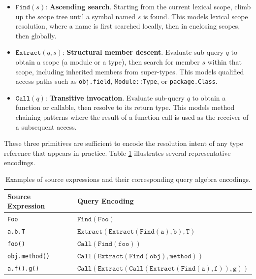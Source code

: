 \begin{itemize}
  \item $\texttt{Find}(s)$: \textbf{Ascending search}. Starting from
    the current lexical scope, climb up the scope tree until a symbol
    named $s$ is found. This models lexical scope resolution, where a
    name is first searched locally, then in enclosing scopes, then globally.
  \item $\texttt{Extract}(q, s)$: \textbf{Structural member descent}.
    Evaluate sub-query $q$ to obtain a scope (a module or a type),
    then search for member $s$ within that scope, including inherited
    members from super-types. This models qualified access paths such
    as \texttt{obj.field}, \texttt{Module::Type}, or \texttt{package.Class}.
  \item $\texttt{Call}(q)$: \textbf{Transitive invocation}. Evaluate
    sub-query $q$ to obtain a function or callable, then resolve to
    its return type. This models method chaining patterns where the
    result of a function call is used as the receiver of a subsequent access.
\end{itemize}

These three primitives are sufficient to encode the resolution intent
of any type reference that appears in practice. Table
\ref{tab:query_examples} illustrates several representative encodings.

\begin{table}[htpb]
  \centering
  \small
  \begin{tabular}{|l|l|}
    \hline
    \textbf{Source Expression} & \textbf{Query Encoding} \\ \hline
    \texttt{Foo} & $\texttt{Find}(\texttt{Foo})$ \\ \hline
    \texttt{a.b.T} &
    $\texttt{Extract}(\texttt{Extract}(\texttt{Find}(\texttt{a}),
    \texttt{b}), \texttt{T})$ \\ \hline
    \texttt{foo()} & $\texttt{Call}(\texttt{Find}(\texttt{foo}))$ \\ \hline
    \texttt{obj.method()} &
    $\texttt{Call}(\texttt{Extract}(\texttt{Find}(\texttt{obj}),
    \texttt{method}))$ \\ \hline
    \texttt{a.f().g()} &
    $\texttt{Call}(\texttt{Extract}(\texttt{Call}(\texttt{Extract}(\texttt{Find}(\texttt{a}),
    \texttt{f})), \texttt{g}))$ \\ \hline
  \end{tabular}
  \caption{Examples of source expressions and their corresponding
  query algebra encodings.}
  \label{tab:query_examples}
\end{table}


